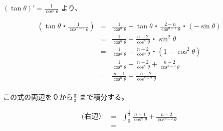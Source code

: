 \documentclass[a4j, 12pt]{jarticle}
\begin{document}
$ ( \tan \theta)' = \frac{1}{\cos^2 \theta} $ より、

\begin{eqnarray}
 ( \tan \theta ・ \frac{1}{\cos^{n-2} \theta}) 
& = & \frac{1}{\cos^n \theta} +  \tan \theta ・  \frac{2-n}{\cos^{n-1} \theta} ・ ( - \sin \theta) \\
& = & \frac{1}{\cos^n \theta} +  \frac{n-2}{\cos^{n} \theta} ・ \sin^2 \theta \\
& = & \frac{1}{\cos^n \theta} +  \frac{n-2}{\cos^{n} \theta} ・ (1 -  \cos^2 \theta ) \\
& = & \frac{1}{\cos^n \theta} +  \frac{n-2}{\cos^{n} \theta} + \frac{n-2}{\cos^{n-2} \theta} \\
& = & \frac{n-1}{\cos^{n} \theta} + \frac{n-2}{\cos^{n-2} \theta} \\
\end{eqnarray}

この式の両辺を０から$\frac{\pi}{3}$ まで積分する。

\begin{eqnarray}
(右辺）　
& = & \int_{0}^{\frac{\pi}{3}} \frac{n-1}{\cos^{n} \theta} + \frac{n-2}{\cos^{n-2} \theta} \\
& = & 
\end{eqnarray}
\end{document}
